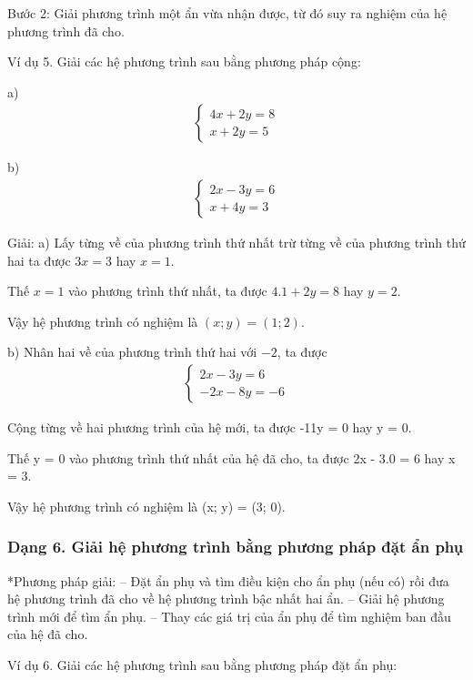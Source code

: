 \documentclass[%
    fontsize=12pt,%
    chapterprefix=false,%
    open=right,%
    twoside=false,%
    numbers=noenddot,%
    headings=optiontohead,%
    final,%
    DIV=15,%
    parskip=half %
]{scrbook}
\begin{document}
Bước 2: Giải phương trình một ẩn vừa nhận được, từ đó suy ra nghiệm của hệ phương trình đã cho.

Ví dụ 5. Giải các hệ phương trình sau bằng phương pháp cộng:

a) \begin{align*} \begin{cases} 4x + 2y = 8 \\ x + 2y = 5 \end{cases} \end{align*}

b) \begin{align*} \begin{cases} 2x - 3y = 6 \\ x + 4y = 3 \end{cases} \end{align*}

Giải: a) Lấy từng về của phương trình thứ nhất trừ từng về của phương trình thứ hai ta được $ 3x = 3 $ hay $ x = 1 $.

Thế $ x = 1 $ vào phương trình thứ nhất, ta được $ 4.1 + 2y = 8 $ hay $ y = 2 $.

Vậy hệ phương trình có nghiệm là $ (x; y) = (1; 2) $.

b) Nhân hai về của phương trình thứ hai với $-2$, ta được \begin{align*} \begin{cases} 2x - 3y = 6 \\ -2x - 8y = -6 \end{cases} \end{align*}


Cộng từng về hai phương trình của hệ mới, ta được -11y = 0 hay y = 0.

Thế y = 0 vào phương trình thứ nhất của hệ đã cho, ta được 2x - 3.0 = 6 hay x = 3.

Vậy hệ phương trình có nghiệm là (x; y) = (3; 0).
\subsubsection{Dạng 6. Giải hệ phương trình bằng phương pháp đặt ẩn phụ}

*Phương pháp giải: -- Đặt ẩn phụ và tìm điều kiện cho ẩn phụ (nếu có) rồi đưa hệ phương trình đã cho về hệ phương trình bậc nhất hai ẩn. -- Giải hệ phương trình mới để tìm ẩn phụ. -- Thay các giá trị của ẩn phụ để tìm nghiệm ban đầu của hệ đã cho.

Ví dụ 6. Giải các hệ phương trình sau bằng phương pháp đặt ẩn phụ:
\end{document}
